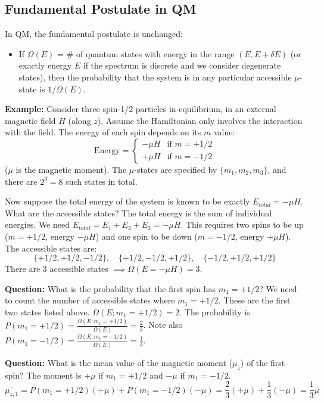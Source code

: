 \documentclass[11pt]{article}
\newcommand{\avg}[1]{\overline{#1}}
\newcommand{\OmegaE}{\Omega(E)}
\newcommand{\deltaE}{\delta E}
\begin{document}
\subsection*{Fundamental Postulate in QM}

In QM, the fundamental postulate is unchanged:
\begin{itemize}
    \item If $\OmegaE$ = \# of quantum states with energy in the range $(E, E+\deltaE)$ (or exactly energy $E$ if the spectrum is discrete and we consider degenerate states), then the probability that the system is in any particular accessible $\mu$-state is $1/\OmegaE$.
\end{itemize}

\textbf{Example:} Consider three spin-1/2 particles in equilibrium, in an external magnetic field $H$ (along $z$). Assume the Hamiltonian only involves the interaction with the field.
The energy of each spin depends on its $m$ value:
\[ \text{Energy} = \begin{cases} -\mu H & \text{if } m=+1/2 \\ +\mu H & \text{if } m=-1/2 \end{cases} \]
($\mu$ is the magnetic moment).
The $\mu$-states are specified by $\{m_1, m_2, m_3\}$, and there are $2^3=8$ such states in total.

Now suppose the total energy of the system is known to be exactly $E_{total} = -\mu H$.
What are the accessible states? The total energy is the sum of individual energies. We need $E_{total} = E_1 + E_2 + E_3 = -\mu H$. This requires two spins to be up ($m=+1/2$, energy $-\mu H$) and one spin to be down ($m=-1/2$, energy $+\mu H$).
The accessible states are:
\[ \{+1/2, +1/2, -1/2\}, \quad \{+1/2, -1/2, +1/2\}, \quad \{-1/2, +1/2, +1/2\} \]
There are 3 accessible states $\implies \Omega(E=-\mu H) = 3$.

\textbf{Question:} What is the probability that the first spin has $m_1 = +1/2$?
We need to count the number of accessible states where $m_1 = +1/2$. These are the first two states listed above.
$\Omega(E; m_1 = +1/2) = 2$.
The probability is $P(m_1 = +1/2) = \frac{\Omega(E; m_1 = +1/2)}{\Omega(E)} = \frac{2}{3}$.
Note also $P(m_1 = -1/2) = \frac{\Omega(E; m_1 = -1/2)}{\Omega(E)} = \frac{1}{3}$.

\textbf{Question:} What is the mean value of the magnetic moment ($\mu_z$) of the first spin?
The moment is $+\mu$ if $m_1=+1/2$ and $-\mu$ if $m_1=-1/2$.
\[ \avg{\mu_{z,1}} = P(m_1=+1/2)(+\mu) + P(m_1=-1/2)(-\mu) = \frac{2}{3}(+\mu) + \frac{1}{3}(-\mu) = \frac{1}{3}\mu \]
\end{document}
